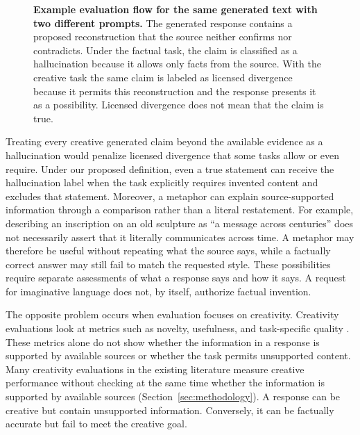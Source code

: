 \documentclass{clv2025}
\begin{document}
\begin{figure}[!t]
{%
}
\endgroup
\caption{\textbf{Example evaluation flow for the same generated text with two different prompts. %
}
The generated response contains a proposed reconstruction that the source neither confirms nor contradicts. Under the factual task, the claim is
classified as a hallucination because it allows only facts from the source.
With the creative task the same claim is labeled as licensed divergence because it permits this reconstruction and the response presents it as a possibility. Licensed divergence does
not mean that the claim is true. %
}
\label{fig:prompt-to-claim}
\end{figure}

Treating every creative generated claim beyond the available evidence as a
hallucination would penalize licensed divergence that some tasks allow or even require.
Under our proposed definition, even a true statement can receive the hallucination label when the task explicitly requires invented content and excludes that statement. %
Moreover, a metaphor can explain source-supported information through a comparison
rather than a literal restatement.
For example, describing an inscription on an old sculpture as ``a message across centuries''
does not necessarily assert that it literally communicates across time.
A metaphor may therefore be useful without repeating what the source says,
while a factually correct answer may still fail to match the requested style.
These possibilities require separate assessments of what a response says
and how it says.
A request for imaginative language does not, by itself, authorize factual invention.

The opposite problem occurs when evaluation focuses on creativity.
Creativity evaluations look at metrics such as novelty, usefulness, and
task-specific quality
\citep{runco_standard_2012,hou_creativityprism_2025,zhao_assessing_2025}.
These metrics alone do not show whether the information in a response is
supported by available sources or whether the task permits unsupported
content.
Many creativity evaluations in the existing literature measure creative
performance without checking at the same time whether the information is
supported by available sources (Section~\ref{sec:methodology}).
A response can be creative but contain unsupported
information. Conversely, it can be factually accurate but fail to meet the creative goal.
\end{document}
